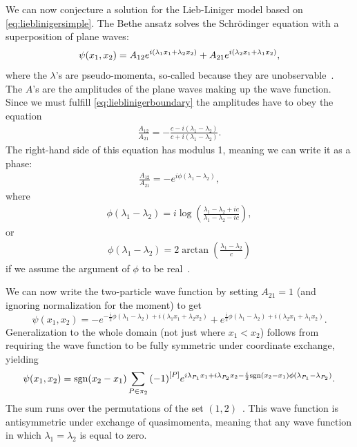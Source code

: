 \documentclass[11pt, a4paper]{report} %
\begin{document}
We can now conjecture a solution for the Lieb-Liniger model based on \cref{eq:lieblinigersimple}.
The Bethe ansatz solves the Schrödinger equation with a superposition of plane waves:
\begin{equation}
	\psi(x_1,x_2) = A_{12} e^{i\qty(\lambda_1x_1 + \lambda_2 x_2)} + A_{21} e^{i(\lambda_2 x_1 + \lambda_1 x_2)},
\end{equation}
where the \(\lambda\)'s are pseudo-momenta, so-called because they are unobservable~\cite{Franchini2017}.
The \(A\)'s are the amplitudes of the plane waves making up the wave function.
Since we must fulfill \cref{eq:lieblinigerboundary} the amplitudes have to obey the equation
\begin{align}
	\frac{A_{12}}{A_{21}} = -\frac{c-i(\lambda_1 - \lambda_2) }{c+i(\lambda_1 - \lambda_2)}.
\end{align}
The right-hand side of this equation has modulus 1, meaning we can write it as a phase:
\begin{align}
	\frac{A_{12}}{A_{21}} = -e^{i\phi(\lambda_1-\lambda_2)},
\end{align}
where~\cite{Korepin1993}
\begin{align}
  \phi(\lambda_1-\lambda_2) = i \log(\frac{\lambda_1-\lambda_2 + ic}{\lambda_1-\lambda_2-ic}),
\end{align}
or
\begin{align}
	\phi(\lambda_1-\lambda_2) = 2\arctan\left(\frac{\lambda_1-\lambda_2}{c}\right)
\end{align}
if we assume the argument of \(\phi\) to be real~\cite{Panfil2014}.

We can now write the two-particle wave function by setting \(A_{21}=1\) (and ignoring normalization for the moment) to get
\begin{equation}
	\psi(x_1,x_2) = - e^{-\frac{i}{2}\phi(\lambda_1-\lambda_2)+i(\lambda_1x_1 + \lambda_2 x_2)} + e^{\frac{i}{2}\phi(\lambda_1-\lambda_2)+i(\lambda_2 x_1 + \lambda_1 x_2)}.
\end{equation}
Generalization to the whole domain (not just where \(x_1 < x_2\)) follows from requiring the wave function to be fully symmetric under coordinate exchange, yielding
\begin{equation}
  \psi\qty(x_1,x_2) = \textrm{sgn}(x_2-x_1)\sum_{P\in\pi_2} {(-1)}^{[P]} e^{i\lambda_{P_1}x_1 + i \lambda_{P_2} x_2- \frac{i}{2} \textrm{sgn}(x_2-x_1)\phi(\lambda_{P_1}-\lambda_{P_2})}.
\end{equation}
The sum runs over the permutations of the set \((1,2)\)~\cite{Caux2015}.
This wave function is antisymmetric under exchange of quasimomenta, meaning that any wave function in which \(\lambda_1=\lambda_2\) is equal to zero.
\end{document}
